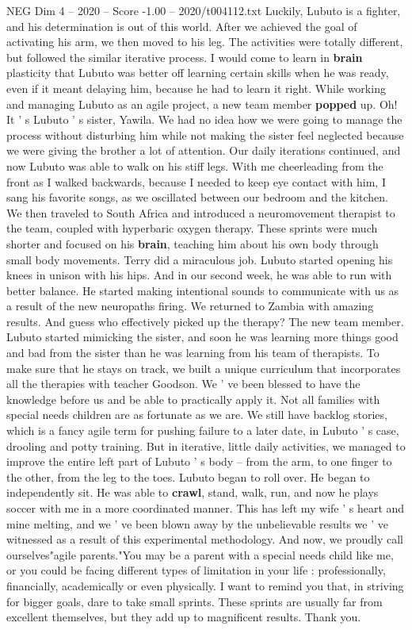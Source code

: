 \begin{textsample}{NEG Dim 4 – 2020 – Score -1.00 – 2020/t004112.txt}
Luckily, Lubuto is a fighter, and his determination is out of this world.
After we achieved the goal of activating his arm, we then moved to his leg.
The activities were totally different, but followed the similar iterative process.
I would come to learn in \textbf{brain} plasticity that Lubuto was better off learning certain skills when he was ready, even if it meant delaying him, because he had to learn it right.
While working and managing Lubuto as an agile project, a new team member \textbf{popped} up.
Oh!
It ' s Lubuto ' s sister, Yawila.
We had no idea how we were going to manage the process without disturbing him while not making the sister feel neglected because we were giving the brother a lot of attention.
Our daily iterations continued, and now Lubuto was able to walk on his stiff legs.
With me cheerleading from the front as I walked backwards, because I needed to keep eye contact with him, I sang his favorite songs, as we oscillated between our bedroom and the kitchen.
We then traveled to South Africa and introduced a neuromovement therapist to the team, coupled with hyperbaric oxygen therapy.
These sprints were much shorter and focused on his \textbf{brain}, teaching him about his own body through small body movements.
Terry did a miraculous job.
Lubuto started opening his knees in unison with his hips.
And in our second week, he was able to run with better balance.
He started making intentional sounds to communicate with us as a result of the new neuropaths firing.
We returned to Zambia with amazing results.
And guess who effectively picked up the therapy?
The new team member.
Lubuto started mimicking the sister, and soon he was learning more things good and bad from the sister than he was learning from his team of therapists.
To make sure that he stays on track, we built a unique curriculum that incorporates all the therapies with teacher Goodson.
We ' ve been blessed to have the knowledge before us and be able to practically apply it.
Not all families with special needs children are as fortunate as we are.
We still have backlog stories, which is a fancy agile term for pushing failure to a later date, in Lubuto ' s case, drooling and potty training.
But in iterative, little daily activities, we managed to improve the entire left part of Lubuto ' s body -- from the arm, to one finger to the other, from the leg to the toes.
Lubuto began to roll over.
He began to independently sit.
He was able to \textbf{crawl}, stand, walk, run, and now he plays soccer with me in a more coordinated manner.
This has left my wife ' s heart and mine melting, and we ' ve been blown away by the unbelievable results we ' ve witnessed as a result of this experimental methodology.
And now, we proudly call ourselves"agile parents."You may be a parent with a special needs child like me, or you could be facing different types of limitation in your life : professionally, financially, academically or even physically.
I want to remind you that, in striving for bigger goals, dare to take small sprints.
These sprints are usually far from excellent themselves, but they add up to magnificent results.
Thank you.

\end{textsample}
